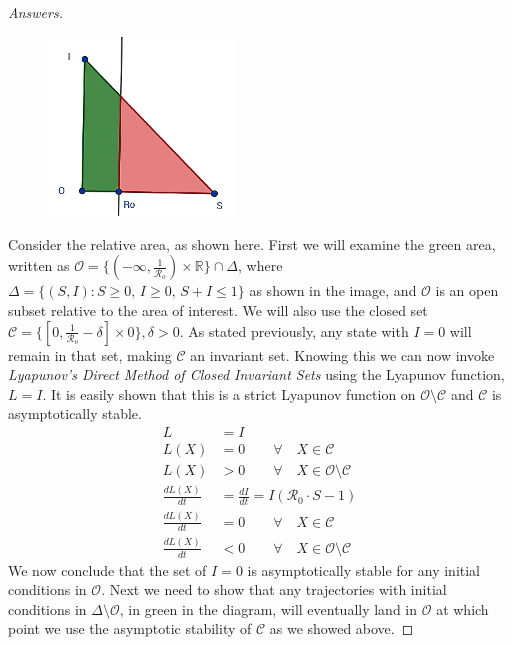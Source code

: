 \documentclass[12pt]{article}
\begin{document}
\begin{enumerate}[(a)]
{\begin{proof}[Answers]
\begin{figure}[h]
\begin{center}
		\includegraphics[width=5cm]{images/4MB3_A1_2c.png}
\end{center}
\end{figure}

Consider the relative area, as shown here. First we will examine the green area, written as ${\mathcal O}=\{(-\infty,\frac{1}{{\mathcal R}_o}) \times \mathbb{R}\}\cap \Delta$, where $\Delta=\{(S,I):S\ge0,\, I\ge0,\, S+I\le1\}$ as shown in the image, and ${\mathcal O}$ is an open subset relative to the area of interest. We will also use the closed set ${\mathcal C}=\{[0,\frac{1}{{\mathcal R}_o}-\delta]\times{0}\}, \delta > 0$. As stated previously, any state with $I=0$ will remain in that set, making $\mathcal C$ an invariant set. Knowing this we can now invoke \textit{Lyapunov's Direct Method of Closed Invariant Sets} using the Lyapunov function, $L= I$. It is easily shown that this is a strict Lyapunov function on $\mathcal{O} \setminus \mathcal{C}$ and $\mathcal{C}$ is asymptotically stable.
\begin{equation}
{\displaystyle {\begin{aligned}
L&=I \\
L(X)&=0 \qquad \forall \quad X \in \mathcal{C} \\
L(X) &> 0 \qquad \forall \quad X \in \mathcal{O} \setminus \mathcal{C} \\
\frac{dL(X)}{dt} &= \frac{dI}{dt}=I(\mathcal{R}_0 \cdot S-1) \\
\frac{dL(X)}{dt} &= 0 \qquad \forall \quad X \in \mathcal{C} \\
\frac{dL(X)}{dt} &< 0 \qquad \forall \quad X \in \mathcal{O} \setminus \mathcal{C}
\end{aligned}}}
\end{equation}
We now conclude that the set of $I=0$ is asymptotically stable for any initial conditions in $\mathcal{O}$.\break
Next we need to show that any trajectories with initial conditions in $\Delta \setminus \mathcal{O}$, in green in the diagram, will eventually land in $\mathcal{O}$ at which point we use the asymptotic stability of $\mathcal{C}$ as we showed above. 

\end{proof}}
\end{enumerate}
\end{document}
